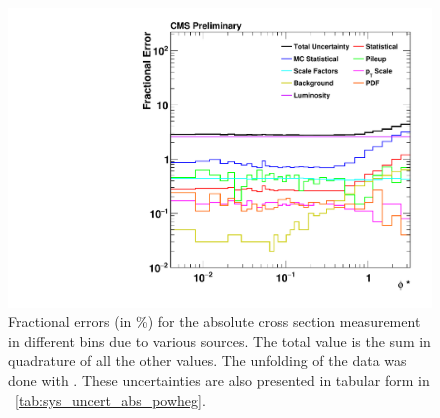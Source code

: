 \begin{figure}[!p]
    \centering
    \includegraphics[width=\textwidth]{figures/data_uncertainty_absolute_powheg_unfolded.pdf}
    \caption[
        Fractional errors (in \%) for the absolute cross section measurement.
    ]{
        Fractional errors (in \%) for the absolute cross section measurement in
        different \phistar bins due to various sources. The total value is the
        sum in quadrature of all the other values. The unfolding of the data
        was done with \POWHEG. These uncertainties are also presented in
        tabular form in \TAB~\ref{tab:sys_uncert_abs_powheg}.
    }
    \label{fig:sys_uncert_abs_powheg}
\end{figure}
